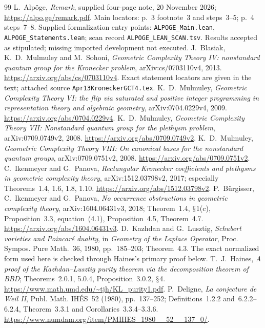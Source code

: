 \documentclass[11pt,a4paper]{article}
\renewcommand{\S}{\ensuremath{\mathsection}}
\theoremstyle{named}\newtheorem{finding}{Finding}[section]
\theoremstyle{definition}\newtheorem{definition}[finding]{Definition}
\theoremstyle{remark}\newtheorem{remark}[finding]{Remark}
\begin{document}
\begin{thebibliography}{99}
 L.~Alp\"oge, \emph{Remark}, supplied four-page note, 20 November 2026; \url{https://alpo.ge/remark.pdf}. Main locators: p.~3 footnote~3 and steps~3--5; p.~4 steps~7--8. Supplied formalization entry points: \texttt{ALPOGE\_Main.lean}, \texttt{ALPOGE\_Statements.lean}; scan record \texttt{ALPOGE\_LEAN\_SCAN.tsv}. Results accepted as stipulated; missing imported development not executed.
 J.~Blasiak, K.~D.~Mulmuley and M.~Sohoni, \emph{Geometric Complexity Theory IV: nonstandard quantum group for the Kronecker problem}, arXiv:cs/0703110v4, 2013. \url{https://arxiv.org/abs/cs/0703110v4}. Exact statement locators are given in the text; attached source \texttt{Apr13KroneckerGCT4.tex}.
 K.~D.~Mulmuley, \emph{Geometric Complexity Theory VI: the flip via saturated and positive integer programming in representation theory and algebraic geometry}, arXiv:0704.0229v4, 2009. \url{https://arxiv.org/abs/0704.0229v4}.
 K.~D.~Mulmuley, \emph{Geometric Complexity Theory VII: Nonstandard quantum group for the plethysm problem}, arXiv:0709.0749v2, 2008. \url{https://arxiv.org/abs/0709.0749v2}.
 K.~D.~Mulmuley, \emph{Geometric Complexity Theory VIII: On canonical bases for the nonstandard quantum groups}, arXiv:0709.0751v2, 2008. \url{https://arxiv.org/abs/0709.0751v2}.
 C.~Ikenmeyer and G.~Panova, \emph{Rectangular Kronecker coefficients and plethysms in geometric complexity theory}, arXiv:1512.03798v2, 2017; especially Theorems~1.4, 1.6, 1.8, 1.10. \url{https://arxiv.org/abs/1512.03798v2}.
 P.~B\"urgisser, C.~Ikenmeyer and G.~Panova, \emph{No occurrence obstructions in geometric complexity theory}, arXiv:1604.06431v3, 2018; Theorem~1.4, \S1(c), Proposition~3.3, equation~(4.1), Proposition~4.5, Theorem~4.7. \url{https://arxiv.org/abs/1604.06431v3}.
 D.~Kazhdan and G.~Lusztig, \emph{Schubert varieties and Poincar\'e duality}, in \emph{Geometry of the Laplace Operator}, Proc. Sympos. Pure Math.~36, 1980, pp.~185--203; Theorem~4.3. The exact normalized form used here is checked through Haines's primary proof below.
 T.~J.~Haines, \emph{A proof of the Kazhdan--Lusztig purity theorem via the decomposition theorem of BBD}; Theorems~2.0.1, 5.0.4, Proposition~3.0.2, \S4. \url{https://www.math.umd.edu/~tjh/KL_purity1.pdf}.
 P.~Deligne, \emph{La conjecture de Weil II}, Publ. Math. IH\'ES~52 (1980), pp.~137--252; Definitions~1.2.2 and~6.2.2--6.2.4, Theorem~3.3.1 and Corollaries~3.3.4--3.3.6. \url{https://www.numdam.org/item/PMIHES_1980__52__137_0/}.

\end{thebibliography}
\end{document}
